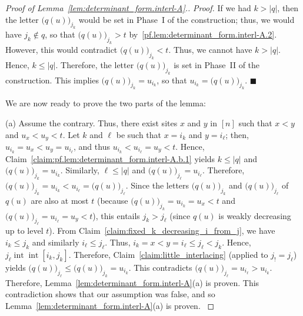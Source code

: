 \documentclass[reqno]{amsart}
\newcommand{\0}{\phantom{c}}
\DeclareMathOperator{\inter}{int} %
\newenvironment{subproof}{\textit{Proof.} }{\hfill$\blacksquare$ \medskip}
\newenvironment{verlong}{}{}
\newenvironment{vershort}{}{}
\newcommand{\abs}[1]{\left| #1 \right|}
\newcommand{\ive}[1]{\left[ #1 \right]}
\theoremstyle{plain}
\theoremstyle{definition}
\numberwithin{equation}{section}
\newcommand{\Darij}[1]{\todo[size=\tiny,inline,color=red!30]{#1
      \\ \hfill --- Darij}}
\newcommand{\Travis}[1]{\todo[size=\tiny,inline,color=blue!30]{#1
      \\ \hfill --- Travis}}
\begin{document}
\begin{proof}[Proof of Lemma~\ref{lem:determinant_form.interl-A}.]
\begin{subproof}
If we had $k > \abs{q}$, then the letter $\bigl( q(u) \bigr)_{j_k}$ would be set in Phase~I of the construction;
thus, we would have $j_k \notin q$, so that $\bigl( q(u) \bigr)_{j_k} > t$ by~\eqref{pf.lem:determinant_form.interl-A.2}.
However, this would contradict $\bigl( q(u) \bigr)_{j_k} < t$.
Thus, we cannot have $k > \abs{q}$.
Hence, $k \leq \abs{q}$.
Therefore, the letter $\bigl( q(u) \bigr)_{j_k}$ is set in Phase~II of the construction.
This implies $\bigl( q(u) \bigr)_{j_k} = u_{i_k}$, so that $u_{i_k} = \bigl( q(u) \bigr)_{j_k}$.
\end{subproof}


We are now ready to prove the two parts of the lemma:

(a) Assume the contrary.
Thus, there exist sites $x$ and $y$ in $\ive{n}$ such that $x < y$ and $u_x < u_y < t$.
Let $k$ and $\ell$ be such that $x = i_k$ and $y = i_{\ell}$; then, $u_{i_k} = u_x < u_y = u_{i_{\ell}}$, and thus $u_{i_k} < u_{i_{\ell}} = u_y < t$.
Hence, Claim~\ref{claim:pf.lem:determinant_form.interl-A.b.1} yields $k \leq \abs{q}$ and $\bigl( q(u) \bigr)_{j_k} = u_{i_k}$.
Similarly, $\ell \leq \abs{q}$ and
$\bigl( q(u) \bigr)_{j_{\ell}} = u_{i_{\ell}}$.
Therefore, $\bigl( q(u) \bigr)_{j_k} = u_{i_k} < u_{i_{\ell}} = \bigl( q(u) \bigr)_{j_{\ell}}$.
Since the letters $\bigl( q(u) \bigr) _{j_k}$ and $\bigl( q(u) \bigr)_{j_{\ell}}$ of $q(u)$ are also at most $t$ (because $\bigl( q(u) \bigr)_{j_k} = u_{i_k} = u_x < t$ and $\bigl( q(u) \bigr)_{j_{\ell }} = u_{i_{\ell}} = u_y < t$), this entails $j_k > j_{\ell}$ (since $q(u)$ is weakly decreasing up to level $t$).
From Claim~\ref{claim:fixed_k_decreasing_i_from_j}, we have $i_k \leq j_k$ and similarly $i_{\ell} \leq j_{\ell}$.
Thus, $i_k = x < y = i_{\ell} \leq j_{\ell} < j_k$.
Hence, $j_{\ell} \inter \inter[i_k, j_k]$.
Therefore, Claim~\ref{claim:little_interlacing} (applied to $j_{!} = j_{\ell}$) yields $\bigl( q(u) \bigr)_{j_{\ell}} \leq \bigl( q(u) \bigr)_{j_k} = u_{i_k}$.
This contradicts $\bigl( q(u) \bigr)_{j_{\ell}} = u_{i_{\ell}} > u_{i_k}$.
\begin{vershort}
Therefore, Lemma~\ref{lem:determinant_form.interl-A}(a) is proven.
\end{vershort}
\begin{verlong}
This contradiction shows that our assumption was false, and so Lemma~\ref{lem:determinant_form.interl-A}(a) is proven.
\end{verlong}


\end{proof}
\end{document}
